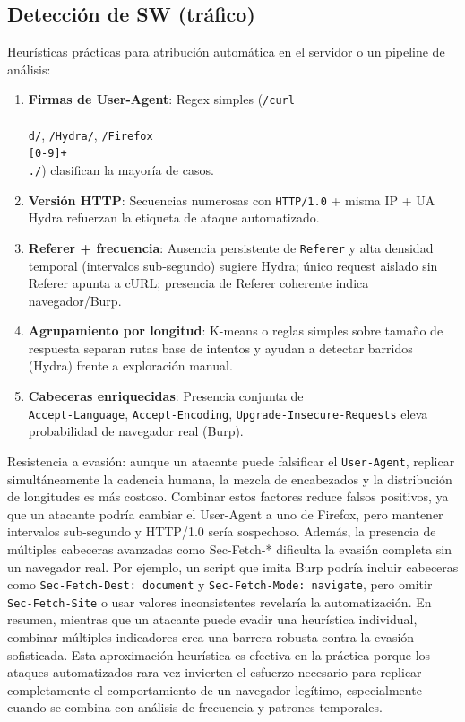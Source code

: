 \documentclass[letterpaper,12pt]{article}
\let\origsubsection\subsection
\renewcommand{\subsection}{\FloatBarrier\origsubsection}
\begin{document}
\subsection{Detección de SW (tráfico)}
Heurísticas prácticas para atribución automática en el servidor o un pipeline de análisis:
\begin{enumerate}
    \item \textbf{Firmas de User-Agent}: Regex simples (\texttt{/curl\\\/\\d/}, \texttt{/Hydra/}, \texttt{/Firefox\\\/[0-9]+\\./}) clasifican la mayoría de casos.
    \item \textbf{Versión HTTP}: Secuencias numerosas con \texttt{HTTP/1.0} + misma IP + UA Hydra refuerzan la etiqueta de ataque automatizado.
    \item \textbf{Referer + frecuencia}: Ausencia persistente de \texttt{Referer} y alta densidad temporal (intervalos sub‑segundo) sugiere Hydra; único request aislado sin Referer apunta a cURL; presencia de Referer coherente indica navegador/Burp.
    \item \textbf{Agrupamiento por longitud}: K-means o reglas simples sobre tamaño de respuesta separan rutas base de intentos y ayudan a detectar barridos (Hydra) frente a exploración manual.
    \item \textbf{Cabeceras enriquecidas}: Presencia conjunta de \\ \texttt{Accept-Language}, \texttt{Accept-Encoding}, \texttt{Upgrade-Insecure-Requests} eleva probabilidad de navegador real (Burp).
\end{enumerate}
Resistencia a evasión: aunque un atacante puede falsificar el \texttt{User-Agent}, replicar simultáneamente la cadencia humana, la mezcla de encabezados y la distribución de longitudes es más costoso. Combinar estos factores reduce falsos positivos, ya que un atacante podría cambiar el User-Agent a uno de Firefox, pero mantener intervalos sub-segundo y HTTP/1.0 sería sospechoso. Además, la presencia de múltiples cabeceras avanzadas como Sec-Fetch-* dificulta la evasión completa sin un navegador real. Por ejemplo, un script que imita Burp podría incluir cabeceras como \texttt{Sec-Fetch-Dest: document} y \texttt{Sec-Fetch-Mode: navigate}, pero omitir \texttt{Sec-Fetch-Site} o usar valores inconsistentes revelaría la automatización. En resumen, mientras que un atacante puede evadir una heurística individual, combinar múltiples indicadores crea una barrera robusta contra la evasión sofisticada. Esta aproximación heurística es efectiva en la práctica porque los ataques automatizados rara vez invierten el esfuerzo necesario para replicar completamente el comportamiento de un navegador legítimo, especialmente cuando se combina con análisis de frecuencia y patrones temporales.
\end{document}
